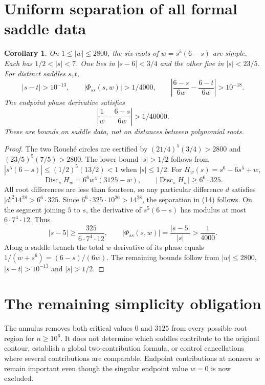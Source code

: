 \documentclass[11pt]{article}
\newtheorem{corollary}[theorem]{Corollary}
\begin{document}
\section{Uniform separation of all formal saddle data}
\begin{corollary}\label{cor:saddles}
On $1\le|w|\le2800$, the six roots of $w=s^5(6-s)$ are simple. Each has
$1/2<|s|<7$. One lies in $|s-6|<3/4$ and the other five in $|s|<23/5$.
For distinct saddles $s,t$,
\[
 |s-t|>10^{-13},\qquad
 |\Phi_{ss}(s,w)|>1/4000,\qquad
 \left|\frac{6-s}{6w}-\frac{6-t}{6w}\right|>10^{-18}.  \tag{14}
\]
The endpoint phase derivative satisfies
\[
 \left|\frac1w-\frac{6-s}{6w}\right|>1/40000.           \tag{15}
\]
These are bounds on saddle data, not on distances between polynomial roots.
\end{corollary}
\begin{proof}
The two Rouch\'e circles are certified by
$(21/4)^5(3/4)>2800$ and $(23/5)^5(7/5)>2800$.
The lower bound $|s|>1/2$ follows from
$|s^5(6-s)|\le(1/2)^5(13/2)<1$ when $|s|\le1/2$.
For $H_w(s)=s^6-6s^5+w$,
\[
 \operatorname{Disc}_s H_w=6^6w^4(3125-w),\qquad
 |\operatorname{Disc}_s H_w|\ge6^6\cdot325.
\]
All root differences are less than fourteen, so any particular difference
$d$ satisfies $|d|^2 14^{28}>6^6\cdot325$. Since
$6^6\cdot325\cdot10^{26}>14^{28}$, the separation in (14) follows.
On the segment joining $5$ to $s$, the derivative of $s^5(6-s)$ has
modulus at most $6\cdot7^4\cdot12$. Thus
\[
 |s-5|\ge\frac{325}{6\cdot7^4\cdot12},\qquad
 |\Phi_{ss}(s,w)|=\frac{|s-5|}{|s|}>\frac1{4000}.
\]
Along a saddle branch the total $w$ derivative of its phase equals
$1/(w+s^6)=(6-s)/(6w)$. The remaining bounds follow from
$|w|\le2800$, $|s-t|>10^{-13}$ and $|s|>1/2$.
\end{proof}

\section{The remaining simplicity obligation}
The annulus removes both critical values $0$ and $3125$ from every
possible root region for $n\ge10^6$. It does not determine which saddles
contribute to the original contour, establish a global two-contribution
formula, or control cancellations where several contributions are comparable.
Endpoint contributions at nonzero $w$ remain important even though the
singular endpoint value $w=0$ is now excluded.
\end{document}
